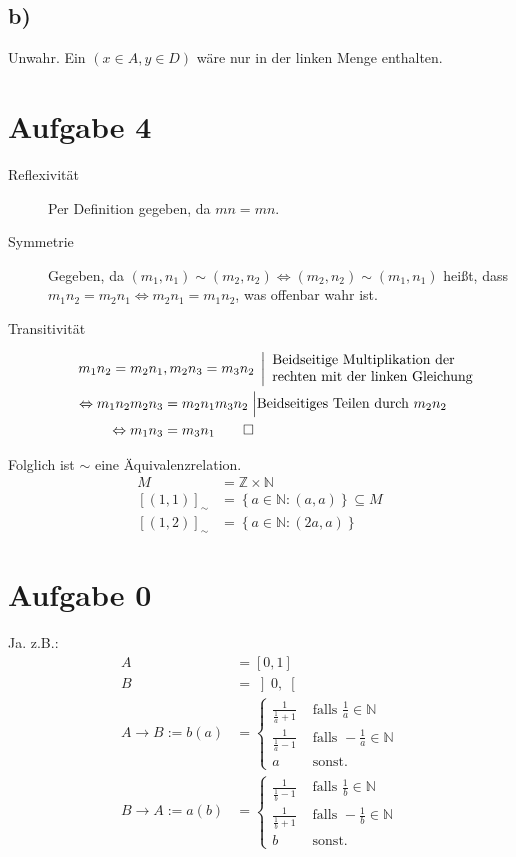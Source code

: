 \documentclass[12pt,a4paper,notitlepage]{article}
\newcommand{\aufgabe}[1]{\section*{\setcounter{section}{#1}Aufgabe #1}}
\begin{document}
\subsection*{b)}
Unwahr. Ein $(x\in A,y\in D)$ wäre nur in der linken Menge enthalten.
\aufgabe{4}
\begin{description}
\item[Reflexivität] Per Definition gegeben, da $mn=mn$.
\item[Symmetrie] Gegeben, da $(m_1,n_1)\sim(m_2,n_2)\Leftrightarrow(m_2,n_2)\sim(m_1,n_1)$ heißt, dass $m_1n_2=m_2n_1\Leftrightarrow m_2n_1=m_1n_2$, was offenbar wahr ist.
\item[Transitivität]
\begin{align}
m_1n_2=m_2n_1&,m_2n_3=m_3n_2\;\left|\begin{array}{l}\text{Beidseitige Multiplikation der}\\\text{rechten mit der linken Gleichung}\end{array}\right.\\
\Leftrightarrow m_1n_2m_2n_3&=m_2n_1m_3n_2\;\Big|\text{Beidseitiges Teilen durch }m_2n_2\\
\Leftrightarrow m_1n_3&=m_3n_1\qed
\end{align}
\end{description}
Folglich ist $\sim$ eine Äquivalenzrelation.
\begin{align}
M&=\mathbb Z\times\mathbb N\\
[(1,1)]_\sim&=\left\{a\in\mathbb N:(a,a)\right\}\subseteq M\\
[(1,2)]_\sim&=\left\{a\in\mathbb N:(2a,a)\right\}
\end{align}
\aufgabe{0}
Ja. z.B.:
\begin{align}
A&=\left[0,1\right]\\
B&=\left]0,\right[\\
A\rightarrow B:=b(a)&=\left\{\begin{array}{cl}\frac{1}{\frac{1}{a}+1}&\text{ falls }\frac{1}{a}\in\mathbb{N}\\\frac{1}{\frac{1}{a}-1}&\text{ falls }-\frac{1}{a}\in\mathbb{N}\\a&\text{ sonst.}\end{array}\right.\\
B\rightarrow A:=a(b)&=\left\{\begin{array}{cl}\frac{1}{\frac{1}{b}-1}&\text{ falls }\frac{1}{b}\in\mathbb{N}\\\frac{1}{\frac{1}{b}+1}&\text{ falls }-\frac{1}{b}\in\mathbb{N}\\b&\text{ sonst.}\end{array}\right.
\end{align}
\end{document}
